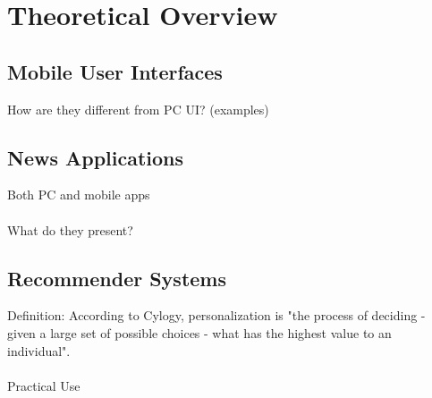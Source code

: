 \chapter{Theoretical Overview}

\section{Mobile User Interfaces}
How are they different from PC UI? (examples)


\section{News Applications}
Both PC and mobile apps
\\\\
What do they present?


\section{Recommender Systems}
Definition: According to Cylogy, personalization is "the process of deciding - given a large set of possible choices - what has the highest value to an individual"\cite{personalization_overview}.\\\\
Practical Use